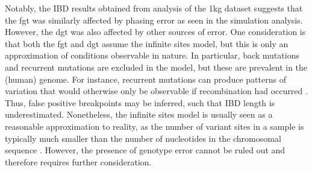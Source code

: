 Notably, the IBD results obtained from analysis of the \gls{1kg} dataset suggests that the \gls{fgt} was similarly affected by phasing error as seen in the simulation analysis.
However, the \gls{dgt} was also affected by other sources of error.
One consideration is that both the \gls{fgt} and \gls{dgt} assume the infinite sites model, but this is only an approximation of conditions observable in nature.
In particular, back mutations and recurrent mutations are excluded in the model, but these are prevalent in the (human) genome.
For instance, recurrent mutations can produce patterns of variation that would otherwise only be observable if recombination had occurred \citep{McVean:2002ws}.
Thus, false positive breakpoints may be inferred, such that IBD length is underestimated.
Nonetheless, the infinite sites model is usually seen as a reasonable approximation to reality, as the number of variant sites in a sample is typically much smaller than the number of nucleotides in the chromosomal sequence \citep{hein2004gene}.
However, the presence of genotype error cannot be ruled out and therefore requires further consideration.


